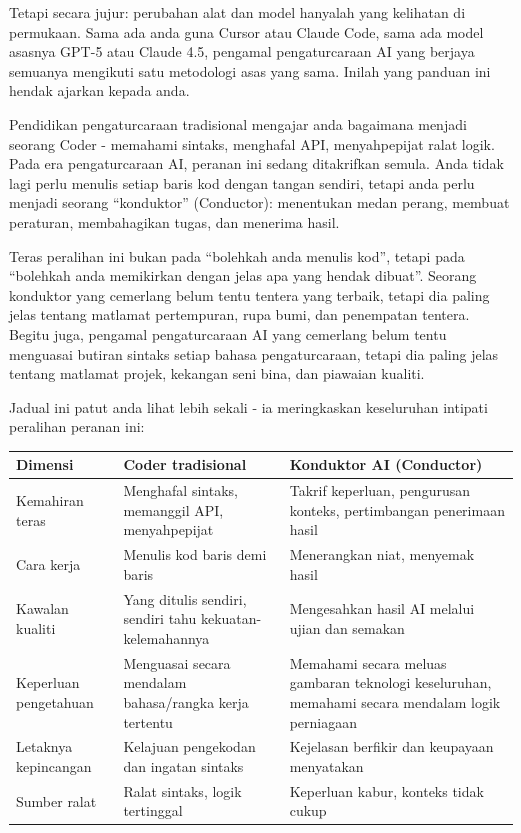 Tetapi secara jujur: perubahan alat dan model hanyalah yang kelihatan di permukaan. Sama ada anda guna Cursor atau Claude Code, sama ada model asasnya GPT-5 atau Claude 4.5, pengamal pengaturcaraan AI yang berjaya semuanya mengikuti satu metodologi asas yang sama. Inilah yang panduan ini hendak ajarkan kepada anda.


Pendidikan pengaturcaraan tradisional mengajar anda bagaimana menjadi seorang Coder - memahami sintaks, menghafal API, menyahpepijat ralat logik. Pada era pengaturcaraan AI, peranan ini sedang ditakrifkan semula. Anda tidak lagi perlu menulis setiap baris kod dengan tangan sendiri, tetapi anda perlu menjadi seorang “konduktor” (Conductor): menentukan medan perang, membuat peraturan, membahagikan tugas, dan menerima hasil.

Teras peralihan ini bukan pada “bolehkah anda menulis kod”, tetapi pada “bolehkah anda memikirkan dengan jelas apa yang hendak dibuat”. Seorang konduktor yang cemerlang belum tentu tentera yang terbaik, tetapi dia paling jelas tentang matlamat pertempuran, rupa bumi, dan penempatan tentera. Begitu juga, pengamal pengaturcaraan AI yang cemerlang belum tentu menguasai butiran sintaks setiap bahasa pengaturcaraan, tetapi dia paling jelas tentang matlamat projek, kekangan seni bina, dan piawaian kualiti.

Jadual ini patut anda lihat lebih sekali - ia meringkaskan keseluruhan intipati peralihan peranan ini:

\begin{center}
\begin{tabularx}{\linewidth}{|X|X|X|}
\hline
\textbf{Dimensi} & \textbf{Coder tradisional} & \textbf{Konduktor AI (Conductor)} \tabularnewline
\hline
Kemahiran teras & Menghafal sintaks, memanggil API, menyahpepijat & Takrif keperluan, pengurusan konteks, pertimbangan penerimaan hasil \tabularnewline
Cara kerja & Menulis kod baris demi baris & Menerangkan niat, menyemak hasil \tabularnewline
Kawalan kualiti & Yang ditulis sendiri, sendiri tahu kekuatan-kelemahannya & Mengesahkan hasil AI melalui ujian dan semakan \tabularnewline
Keperluan pengetahuan & Menguasai secara mendalam bahasa/rangka kerja tertentu & Memahami secara meluas gambaran teknologi keseluruhan, memahami secara mendalam logik perniagaan \tabularnewline
Letaknya kepincangan & Kelajuan pengekodan dan ingatan sintaks & Kejelasan berfikir dan keupayaan menyatakan \tabularnewline
Sumber ralat & Ralat sintaks, logik tertinggal & Keperluan kabur, konteks tidak cukup \tabularnewline
\hline
\end{tabularx}
\end{center}

